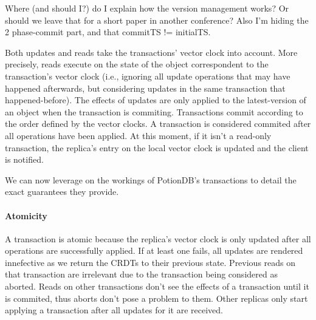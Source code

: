 \documentclass{vldb}
\newcommand{\grumbler}[2]{{\color{red}{\bf #1:} #2}}
\newcommand{\andre}[1]{\grumbler{andre}{#1}}
\begin{document}
\andre{Where (and should I?) do I explain how the version management works? Or should we leave that for a short paper in another conference? Also I'm hiding the 2 phase-commit part, and that commitTS != initialTS.}

Both updates and reads take the transactions' vector clock into account.
More precisely, reads execute on the state of the object correspondent to the transaction's vector clock (i.e., ignoring all update operations that may have happened afterwards, but considering updates in the same transaction that happened-before).
The effects of updates are only applied to the latest-version of an object when the transaction is commiting.
Transactions commit according to the order defined by the vector clocks.
A transaction is considered commited after all operations have been applied.
At this moment, if it isn't a read-only transaction, the replica's entry on the local vector clock is updated and the client is notified.

We can now leverage on the workings of PotionDB's transactions to detail the exact guarantees they provide.


\paragraph{Atomicity}  A transaction is atomic because the replica's vector clock is only updated after all operations are successfully applied. 
If at least one fails, all updates are rendered innefective as we return the CRDTs to their previous state.
Previous reads on that transaction are irrelevant due to the transaction being considered as aborted.
Reads on other transactions don't see the effects of a transaction until it is commited, thus aborts don't pose a problem to them.
Other replicas only start applying a transaction after all updates for it are received.
\end{document}
